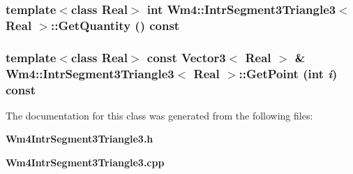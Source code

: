 \subsubsection{\setlength{\rightskip}{0pt plus 5cm}template$<$class Real$>$ int {\bf Wm4::Intr\-Segment3Triangle3}$<$ Real $>$::Get\-Quantity () const}\label{classWm4_1_1IntrSegment3Triangle3_1c9ecd76e19183d907ca8d57e864ed7b}


\subsubsection{\setlength{\rightskip}{0pt plus 5cm}template$<$class Real$>$ const {\bf Vector3}$<$ Real $>$ \& {\bf Wm4::Intr\-Segment3Triangle3}$<$ Real $>$::Get\-Point (int {\em i}) const}\label{classWm4_1_1IntrSegment3Triangle3_04684d5627edf7335bac7730cf4767a7}




The documentation for this class was generated from the following files:\begin{CompactItemize}
\item 
{\bf Wm4Intr\-Segment3Triangle3.h}\item 
{\bf Wm4Intr\-Segment3Triangle3.cpp}\end{CompactItemize}
